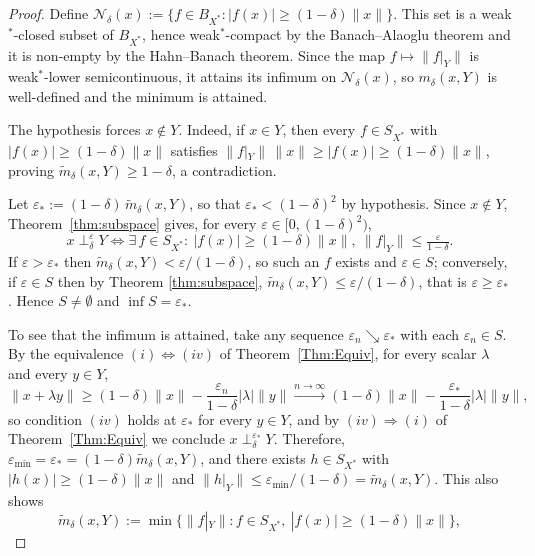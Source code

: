 \documentclass[11pt, reqno]{amsart}
\theoremstyle{definition}
\begin{document}
\begin{proof}
Define $\mathscr{N}_\delta(x) := \{ f \in B_{X^*} : |f(x)| \geq (1-\delta)\|x\| \}$.
This set is a weak$^*$-closed subset of $B_{X^*}$, hence weak$^*$-compact by the
Banach--Alaoglu theorem and it is non-empty by the Hahn--Banach
theorem. Since the map $f \mapsto \|f|_Y\|$ is
weak$^*$-lower semicontinuous, it attains its infimum on $\mathscr{N}_\delta(x)$,
so $m_\delta(x,Y)$ is well-defined and the minimum is attained.


\medskip

\noindent The hypothesis forces $x\notin Y$. Indeed, if $x\in Y$, then every $f\in S_{X^*}$ with $|f(x)|\geq(1-\delta)\|x\|$ satisfies $\|f|_Y\|\,\|x\|\geq |f(x)|\geq (1-\delta)\|x\|$, proving $\widetilde m_\delta(x,Y)\geq 1-\delta$, a contradiction.


\medskip


\noindent Let $\varepsilon_* := (1-\delta)\,\widetilde m_\delta(x,Y)$,
so that $\varepsilon_*<(1-\delta)^2$ by hypothesis. Since $x\notin Y$,
Theorem~\ref{thm:subspace} gives, for every $\varepsilon\in[0,(1-\delta)^2)$,
\[
x \perp_\delta^{\varepsilon} Y \iff \exists\, f\in S_{X^*}:~ |f(x)|\geq (1-\delta)\|x\|,~
\|f|_Y\|\leq \tfrac{\varepsilon}{1-\delta}.
\]
If $\varepsilon>\varepsilon_*$ then $\widetilde m_\delta(x,Y)<\varepsilon/(1-\delta)$, so
such an $f$ exists and $\varepsilon\in S$; conversely, if $\varepsilon\in S$ then by Theorem \ref{thm:subspace}, $\widetilde m_\delta(x,Y)\leq \varepsilon/(1-\delta)$, that is
$\varepsilon\geq\varepsilon_*$. Hence $S\neq\emptyset$ and $\inf S=\varepsilon_*$.


\medskip

\noindent To see that the infimum is attained, take any sequence
$\varepsilon_n \searrow \varepsilon_*$
with each $\varepsilon_n \in S$. By the equivalence
$(i)\Leftrightarrow(iv)$ of Theorem~\ref{Thm:Equiv}, for every scalar $\lambda$
and every $y \in Y$,
\[
\|x + \lambda y\|
\geq (1-\delta)\|x\| - \frac{\varepsilon_n}{1-\delta}|\lambda|\|y\|
\xrightarrow{n \to \infty}
(1-\delta)\|x\| - \frac{\varepsilon_*}{1-\delta}|\lambda|\|y\|,
\]
so condition $(iv)$ holds at $\varepsilon_*$ for every $y \in Y$, and by
$(iv)\Rightarrow(i)$ of Theorem~\ref{Thm:Equiv} we conclude
$x \perp_\delta^{\varepsilon_*} Y$. Therefore, $\varepsilon_{\min}=\varepsilon_*=(1-\delta)\widetilde m_\delta(x,Y)$, and there exists $h\in S_{X^*}$ with
$|h(x)|\geq(1-\delta)\|x\|$ and $\|h|_Y\|\leq \varepsilon_{\min}/(1-\delta)=\widetilde m_\delta(x,Y)$. This also shows
\[
\widetilde m_\delta(x,Y) := \min\bigl\{\|f|_Y\| : f \in S_{X^*},\
|f(x)| \geq (1-\delta)\|x\|\bigr\},
\]


\end{proof}
\end{document}
